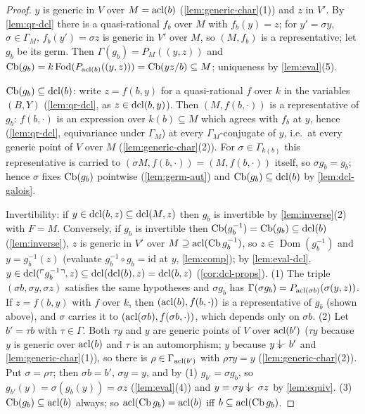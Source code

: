 \begin{proof}
$y$ is generic in $V$ over $M=\operatorname{acl}(b)$ (\cref{lem:generic-char}(1)) and $z$ in $V'$.
By \cref{lem:qr-dcl} there is a quasi-rational $f_b$ over $M$ with $f_b(y)=z$; for
$y'=\sigma y$, $\sigma\in\Gamma_M$, $f_b(y')=\sigma z$ is generic in $V'$ over $M$, so
$(M,f_b)$ is a representative; let $g_b$ be its germ.  Then $\Gamma(g_b)=P_M((y,z))$ and
$\operatorname{Cb}(g_b)=k\operatorname{Fod}(P_{\operatorname{acl}(b)}((y,z)))=\operatorname{Cb}(yz/b)\subseteq M$; uniqueness by
\cref{lem:eval}(5).

$\operatorname{Cb}(g_b)\subseteq\operatorname{dcl}(b)$: write $z=f(b,y)$ for a quasi-rational $f$ over $k$ in the
variables $(B,Y)$ (\cref{lem:qr-dcl}, as $z\in\operatorname{dcl}(b,y)$).  Then $(M,f(b,\cdot))$ is a
representative of $g_b$: $f(b,\cdot)$ is an expression over $k(b)\subseteq M$ which agrees
with $f_b$ at $y$, hence (\cref{lem:qr-dcl}, equivariance under $\Gamma_M$) at every
$\Gamma_M$-conjugate of $y$, i.e.\ at every generic point of $V$ over $M$
(\cref{lem:generic-char}(2)).  For $\sigma\in\Gamma_{k(b)}$ this representative is carried
to $(\sigma M,f(b,\cdot))=(M,f(b,\cdot))$ itself, so $\sigma g_b=g_b$; hence $\sigma$ fixes
$\operatorname{Cb}(g_b)$ pointwise (\cref{lem:germ-aut}) and $\operatorname{Cb}(g_b)\subseteq\operatorname{dcl}(b)$ by
\cref{lem:dcl-galois}.

Invertibility: if $y\in\operatorname{dcl}(b,z)\subseteq\operatorname{dcl}(M,z)$ then $g_b$ is invertible by
\cref{lem:inverse}(2) with $F=M$.  Conversely, if $g_b$ is invertible then
$\operatorname{Cb}(g_b^{-1})=\operatorname{Cb}(g_b)\subseteq\operatorname{dcl}(b)$ (\cref{lem:inverse}), $z$ is generic in $V'$ over
$M\supseteq\operatorname{acl}(\operatorname{Cb} g_b^{-1})$, so $z\in\operatorname{Dom}(g_b^{-1})$ and
$y=g_b^{-1}(z)$ (evaluate $g_b^{-1}\circ g_b=\mathrm{id}$ at $y$, \cref{lem:comp}); by
\cref{lem:eval-dcl}, $y\in\operatorname{dcl}(\ulcorner g_b^{-1}\urcorner,z)\subseteq\operatorname{dcl}(\operatorname{dcl}(b),z)=\operatorname{dcl}(b,z)$
(\cref{cor:dcl-props}).
(1) The triple $(\sigma b,\sigma y,\sigma z)$ satisfies the same hypotheses and
$\sigma g_b$ has $\Gamma(\sigma g_b)=P_{\operatorname{acl}(\sigma b)}(\sigma(y,z))$.  If $z=f(b,y)$ with
$f$ over $k$, then $(\operatorname{acl}(b),f(b,\cdot))$ is a representative of $g_b$ (shown above), and
$\sigma$ carries it to $(\operatorname{acl}(\sigma b),f(\sigma b,\cdot))$, which depends only on
$\sigma b$.
(2) Let $b'=\tau b$ with $\tau\in\Gamma$.  Both $\tau y$ and $y$ are generic points of
$V$ over $\operatorname{acl}(b')$ ($\tau y$ because $y$ is generic over $\operatorname{acl}(b)$ and $\tau$ is an
automorphism; $y$ because $y\ind{}b'$ and \cref{lem:generic-char}(1)), so there is
$\rho\in\Gamma_{\operatorname{acl}(b')}$ with $\rho\tau y=y$ (\cref{lem:generic-char}(2)).  Put
$\sigma=\rho\tau$; then $\sigma b=b'$, $\sigma y=y$, and by (1) $g_{b'}=\sigma g_b$, so
$g_{b'}(y)=\sigma(g_b(y))=\sigma z$ (\cref{lem:eval}(4)) and
$y=\sigma y\ind{}\sigma z$ by \cref{lem:equiv}.
(3) $\operatorname{Cb}(g_b)\subseteq\operatorname{acl}(b)$ always; so $\operatorname{acl}(\operatorname{Cb} g_b)=\operatorname{acl}(b)$ iff $b\subseteq\operatorname{acl}(\operatorname{Cb} g_b)$.
\end{proof}

